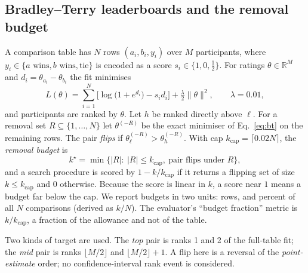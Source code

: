 \documentclass{article}
\newcommand{\kcap}{k_{\mathrm{cap}}}
\newcommand{\hi}{h}
\newcommand{\lo}{\ell}
\begin{document}
\subsection{Bradley--Terry leaderboards and the removal budget}
A comparison table has $N$ rows $(a_i,b_i,y_i)$ over $M$ participants, where $y_i\in\{\text{$a$ wins},\text{$b$ wins},\text{tie}\}$ is encoded as a score $s_i\in\{1,0,\tfrac12\}$. For ratings $\theta\in\mathbb{R}^M$ and $d_i=\theta_{a_i}-\theta_{b_i}$ the fit minimises
\begin{equation}
L(\theta)=\sum_{i=1}^{N}\Big[\log\!\big(1+e^{d_i}\big)-s_i d_i\Big]+\tfrac{\lambda}{2}\lVert\theta\rVert^2,\qquad \lambda=0.01,
\label{eq:bt}
\end{equation}
and participants are ranked by $\theta$. Let $\hi$ be ranked directly above $\lo$. For a removal set $R\subseteq\{1,\dots,N\}$ let $\theta^{(-R)}$ be the exact minimiser of Eq.~\eqref{eq:bt} on the remaining rows. The pair \emph{flips} if $\theta^{(-R)}_{\lo}>\theta^{(-R)}_{\hi}$. With cap $\kcap=\lceil 0.02N\rceil$, the \emph{removal budget} is
\begin{equation}
k^\star=\min\{|R|:\ |R|\le\kcap,\ \text{pair flips under }R\},
\end{equation}
and a search procedure is scored by $1-k/\kcap$ if it returns a flipping set of size $k\le\kcap$ and $0$ otherwise. Because the score is linear in $k$, a score near $1$ means a budget far below the cap. We report budgets in two units: rows, and percent of all $N$ comparisons (derived as $k/N$). The evaluator's ``budget fraction'' metric is $k/\kcap$, a fraction of the allowance and not of the table.

Two kinds of target are used. The \emph{top} pair is ranks 1 and 2 of the full-table fit; the \emph{mid} pair is ranks $\lfloor M/2\rfloor$ and $\lfloor M/2\rfloor+1$. A flip here is a reversal of the \emph{point-estimate} order; no confidence-interval rank event is considered.
\end{document}
